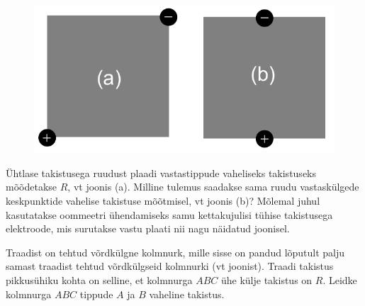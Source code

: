 \documentclass[10pt]{article}
\begin{document}
\begin{figure}
  \vspace{-25pt}
  \begin{center}
  \includegraphics[scale=0.44]{2020-v3g-10-yl.pdf}
  \end{center}
  \vspace{-25pt}
\end{figure}
Ühtlase takistusega ruudust plaadi vastastippude vaheliseks takistuseks mõõdetakse
$R$, vt joonis (a). Milline tulemus saadakse sama ruudu vastaskülgede keskpunktide
vahelise takistuse mõõtmisel, vt joonis (b)? Mõlemal juhul kasutatakse oommeetri
ühendamiseks samu kettakujulisi tühise takistusega elektroode, mis surutakse vastu
plaati nii nagu näidatud joonisel.
\probend
\bigskip


Traadist on tehtud võrdkülgne kolmnurk, mille sisse on pandud lõputult palju samast traadist tehtud võrdkülgseid kolmnurki (vt joonist). Traadi takistus pikkusühiku kohta on selline, et kolmnurga $ABC$ ühe külje takistus on $R$. Leidke kolmnurga $ABC$ tippude $A$ ja $B$ vaheline takistus.

\begin{figure}[h]
  \centering
\end{figure}
\probend
\bigskip
\end{document}
